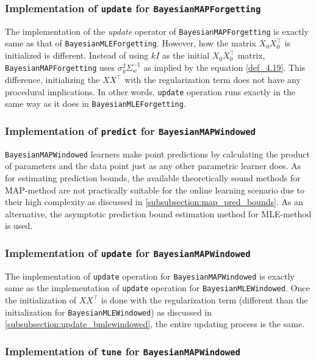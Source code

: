 \subsubsection{Implementation of \texttt{update} for \texttt{BayesianMAPForgetting}}

The implementation of the \textit{update} operator of \texttt{BayesianMAPForgetting} is exactly same as that of \texttt{BayesianMLEForgetting}. However, how the matrix $X_0X_0^{\top}$ is initialized is different. Instead of using $kI$ as the initial $X_0X_0^{\top}$ matrix, \texttt{BayesianMAPForgetting} uses $\sigma_y^2 \Sigma_w^{-1}$ as implied by the equation \ref{def_4.19}. This difference, initializing the $XX^{\top}$ with the regularization term does not have any procedural implications. In other words, \texttt{update} operation runs exactly in the same way as it does in \texttt{BayesianMLEForgetting}.

\subsubsection{Implementation of \texttt{predict} for \texttt{BayesianMAPWindowed}}

\texttt{BayesianMAPWindowed} learners make point predictions by calculating the product of parameters and the data point just as any other parametric learner does. As for estimating prediction bounds, the available theoretically sound methods for MAP-method are not practically suitable for the online learning scenario due to their high complexity as discussed in \ref{subsubsection:map_pred_bounds}. As an alternative, the asymptotic prediction bound estimation method for MLE-method is used.

\subsubsection{Implementation of \texttt{update} for \texttt{BayesianMAPWindowed}}

The implementation of \texttt{update} operation for \texttt{BayesianMAPWindowed} is exactly same as the implementation of \texttt{update} operation for \texttt{BayesianMLEWindowed}. Once the initialization of $XX^{\top}$ is done with the regularization term (different than the initialization for \texttt{BayesianMLEWindowed}) as discussed in \ref{subsubsection:update_bmlewindowed}, the entire updating process is the same.

\subsubsection{Implementation of \texttt{tune} for \texttt{BayesianMAPWindowed}}

